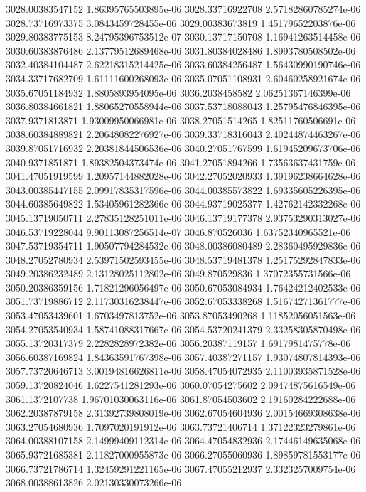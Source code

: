 {3028.00383547152 1.86395765503895e-06
3028.33716922708 2.57182860785274e-06
3028.73716973375 3.0843459728455e-06
3029.00383673819 1.45179652203876e-06
3029.80383775153 8.24795396753512e-07
3030.13717150708 1.16941263514458e-06
3030.60383876486 2.13779512689468e-06
3031.80384028486 1.8993780508502e-06
3032.40384104487 2.62218315214425e-06
3033.60384256487 1.56430990190746e-06
3034.33717682709 1.61111600268093e-06
3035.07051108931 2.60460258921674e-06
3035.67051184932 1.8805893954095e-06
3036.2038458582 2.06251367146399e-06
3036.80384661821 1.88065270558944e-06
3037.53718088043 1.25795476846395e-06
3037.9371813871 1.93009950066981e-06
3038.27051514265 1.82511760506691e-06
3038.60384889821 2.20648082276927e-06
3039.33718316043 2.40244874463267e-06
3039.87051716932 2.20381844506536e-06
3040.27051767599 1.61945209673706e-06
3040.9371851871 1.89382504373474e-06
3041.27051894266 1.73563637431759e-06
3041.47051919599 1.20957144882028e-06
3042.27052020933 1.39196238664628e-06
3043.00385447155 2.09917835317596e-06
3044.00385573822 1.69335605226395e-06
3044.60385649822 1.53405961282366e-06
3044.93719025377 1.42762142332268e-06
3045.13719050711 2.27835128251011e-06
3046.13719177378 2.93753290313027e-06
3046.53719228044 9.90113087256514e-07
3046.870526036 1.63752340965521e-06
3047.53719354711 1.90507794284532e-06
3048.00386080489 2.28360495929836e-06
3048.27052780934 2.53971502593455e-06
3048.53719481378 1.25175292847833e-06
3049.20386232489 2.13128025112802e-06
3049.870529836 1.37072355731566e-06
3050.20386359156 1.71821296056497e-06
3050.67053084934 1.76424212402533e-06
3051.73719886712 2.11730316238447e-06
3052.67053338268 1.51674271361777e-06
3053.47053439601 1.6703497813752e-06
3053.87053490268 1.11852056051563e-06
3054.27053540934 1.58741088317667e-06
3054.53720241379 2.33258305870498e-06
3055.13720317379 2.2282828972382e-06
3056.20387119157 1.6917981475778e-06
3056.60387169824 1.84363591767398e-06
3057.40387271157 1.93074807814393e-06
3057.73720646713 3.00194816626811e-06
3058.47054072935 2.11003935871528e-06
3059.13720824046 1.6227541281293e-06
3060.07054275602 2.09474875616549e-06
3061.1372107738 1.96701030063116e-06
3061.87054503602 2.19160284222688e-06
3062.20387879158 2.31392739808019e-06
3062.67054604936 2.00154669308638e-06
3063.27054680936 1.7097020191912e-06
3063.73721406714 1.37122323279861e-06
3064.00388107158 2.14999409112314e-06
3064.47054832936 2.17446149635068e-06
3065.93721685381 2.11827000955873e-06
3066.27055060936 1.89859781553177e-06
3066.73721786714 1.32459291221165e-06
3067.47055212937 2.3323257009754e-06
3068.00388613826 2.02130330073266e-06
}

